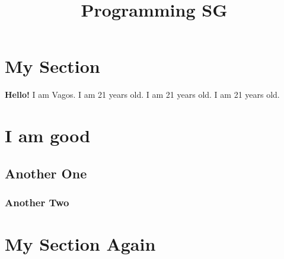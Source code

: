\documentclass{article}
\title{Programming SG}
\begin{document}
\maketitle


\tableofcontents
\newpage


\section{My Section}

\textbf{Hello!}
I am Vagos.
I am 21 years old.
I am 21 years old.
I am 21 years old.

\section{I am good}

\subsection{Another One}
\subsubsection*{Another Two}

\section{My Section Again}
\end{document}
